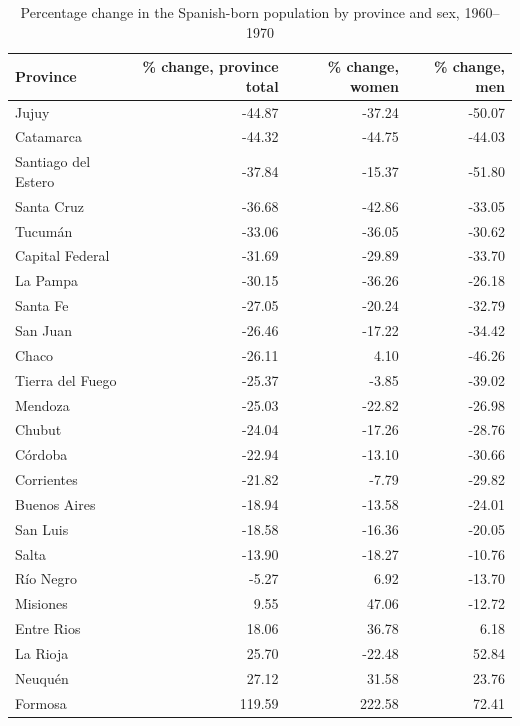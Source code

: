 \begin{table}

\caption{Percentage change in the Spanish-born population by province and sex, 1960--1970}
\centering
\begin{tabular}[t]{lrrr}
\toprule
Province & \% change, province total & \% change, women & \% change, men\\
\midrule
Jujuy & -44.87 & -37.24 & -50.07\\
Catamarca & -44.32 & -44.75 & -44.03\\
Santiago del Estero & -37.84 & -15.37 & -51.80\\
Santa Cruz & -36.68 & -42.86 & -33.05\\
Tucumán & -33.06 & -36.05 & -30.62\\
\addlinespace
Capital Federal & -31.69 & -29.89 & -33.70\\
La Pampa & -30.15 & -36.26 & -26.18\\
Santa Fe & -27.05 & -20.24 & -32.79\\
San Juan & -26.46 & -17.22 & -34.42\\
Chaco & -26.11 & 4.10 & -46.26\\
\addlinespace
Tierra del Fuego & -25.37 & -3.85 & -39.02\\
Mendoza & -25.03 & -22.82 & -26.98\\
Chubut & -24.04 & -17.26 & -28.76\\
Córdoba & -22.94 & -13.10 & -30.66\\
Corrientes & -21.82 & -7.79 & -29.82\\
\addlinespace
Buenos Aires & -18.94 & -13.58 & -24.01\\
San Luis & -18.58 & -16.36 & -20.05\\
Salta & -13.90 & -18.27 & -10.76\\
Río Negro & -5.27 & 6.92 & -13.70\\
Misiones & 9.55 & 47.06 & -12.72\\
\addlinespace
Entre Rios & 18.06 & 36.78 & 6.18\\
La Rioja & 25.70 & -22.48 & 52.84\\
Neuquén & 27.12 & 31.58 & 23.76\\
Formosa & 119.59 & 222.58 & 72.41\\
\bottomrule
\end{tabular}
\end{table}

